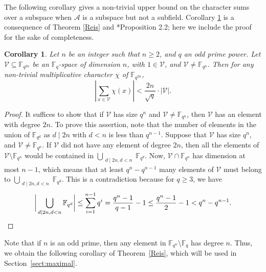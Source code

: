\documentclass[12pt,reqno]{amsart}
\newtheorem{cor}[thm]{Corollary}
\theoremstyle{definition}
\newcommand{\F}{\mathbb{F}}
\begin{document}
The following corollary gives a non-trivial upper bound on the character sums over a subspace when $\mathcal{A}$ is a subspace but not a subfield. Corollary \ref{charsumcor} is a consequence of Theorem \ref{Reis} and \cite{Reis}*{Proposition 2.2}; here we include the proof for the sake of completeness.

\begin{cor}\label{charsumcor}
Let $n$ be an integer such that $n \geq 2$, and $q$ an odd prime power. Let $\mathcal{V} \subseteq \mathbb{F}_{q^{{2n}}}$ be an $\mathbb{F}_{q}$-space of dimension $n$, with $1 \in \mathcal{V}$, and $\mathcal{V} \neq \mathbb{F}_{q^{n}}$. Then for any non-trivial multiplicative character $\chi$ of $\mathbb{F}_{q^{2n}}$,
\begin{equation} \label{charsum}
\left|\sum_{x \in \mathcal{V}} \chi(x)\right|< \frac{2n}{\sqrt{q}} \cdot |\mathcal{V}|.    
\end{equation}
\end{cor}
\begin{proof}

It suffices to show that if $\mathcal{V}$ has size $q^{n}$ and $\mathcal{V}\neq \F_{q^{n}}$, then $\mathcal{V}$ has an element with degree $2n$. To prove this assertion, note that the number of elements in the union of $\F_{q^{d}}$ as $d\mid 2n$ with $d<n$ is less than $q^{n-1}$. Suppose that $\mathcal{V}$ has size $q^{n}$, and $\mathcal{V}\neq \F_{q^{n}}$. If $\mathcal{V}$ did not have any element of degree $2n$, then all the elements of $\mathcal{V}\setminus \F_{q^{n}}$ would be contained in $\bigcup_{\substack{d\mid 2n, d<n}} \F_{q^d}$. Now, $\mathcal{V}\cap \F_{q^{n}}$ has dimension at most $n-1$, which means that at least $q^{n}-q^{n-1}$ many elements of $\mathcal{V}$ must belong to  $\bigcup_{\substack{d\mid 2n, d<n}} \F_{q^d}$. This is a contradiction because for $q\geq 3$, we have
\[
\bigg|\bigcup_{\substack{d\mid 2n, d<n}} \F_{q^d} \bigg| \leq \sum_{i=1}^{n-1} q^{i} = \frac{q^n-1}{q-1} - 1 \leq \frac{q^n-1}{2}-1<q^{n}-q^{n-1}.   \qedhere
\]
\end{proof}


Note that if $n$ is an odd prime, then any element in $\F_{q^n} \setminus \F_q$ has degree $n$. Thus, we obtain the following corollary of Theorem~\ref{Reis}, which will be used in Section~\ref{sect:maximal}. 
\end{document}
